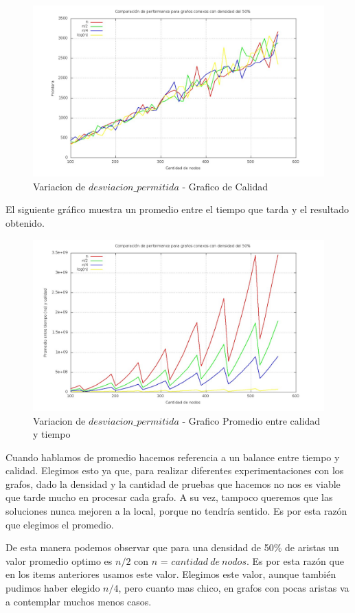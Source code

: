 \begin{figure}[H] %
\begin{center}
\includegraphics[width=400pt]{../imgs/variacioncalidad_tabu.jpg}
\caption{Variacion de $desviacion\_permitida$ - Grafico de Calidad}
\end{center}
\end{figure}

El siguiente gráfico muestra un promedio entre el tiempo que tarda y el resultado obtenido.

\begin{figure}[H] %
\begin{center}
\includegraphics[width=400pt]{../imgs/variacionpromedio_tabu.jpg}
\caption{Variacion de $desviacion\_permitida$ - Grafico Promedio entre calidad y tiempo}
\end{center}
\end{figure}

 Cuando hablamos de promedio hacemos referencia a un balance entre tiempo y calidad. Elegimos esto ya que,  para realizar diferentes experimentaciones con los grafos, dado la densidad y la cantidad de pruebas que hacemos no nos es viable que tarde mucho en procesar cada grafo. A su vez, tampoco queremos que las soluciones nunca mejoren a la local, porque no tendría sentido. Es por esta razón que elegimos el promedio.

 De esta manera podemos observar que para una densidad de 50$\%$ de aristas un valor promedio optimo es $n/2$ con $n$ = $cantidad\ de\ nodos$. Es por esta razón que en los items anteriores usamos este valor. Elegimos este valor, aunque también pudimos haber elegido $n/4$, pero cuanto mas chico, en grafos con pocas aristas va a contemplar muchos menos casos.

